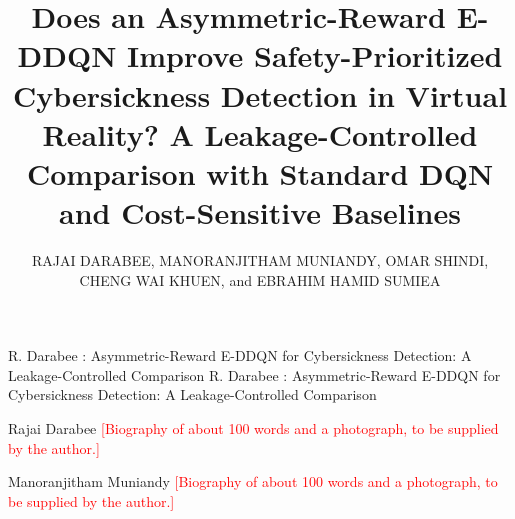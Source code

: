 \documentclass{ieeeaccess}
\newcounter{biography}  %
\newcommand{\authorinput}[1]{\textcolor{red}{[#1]}}
\begin{document}
\newlength{\xfigwd}\setlength{\xfigwd}{\columnwidth}  %

\title{Does an Asymmetric-Reward E-DDQN Improve Safety-Prioritized Cybersickness Detection in Virtual Reality? A Leakage-Controlled Comparison with Standard DQN and Cost-Sensitive Baselines}

\author{\uppercase{Rajai Darabee},
\uppercase{Manoranjitham Muniandy},
\uppercase{Omar Shindi},
\uppercase{Cheng Wai Khuen}, and
\uppercase{Ebrahim Hamid Sumiea}}

\address[1]{Faculty of Science, Management \& Computing, Universiti Teknologi PETRONAS, 32610 Seri Iskandar, Perak, Malaysia}
\address[2]{School of Information Technology, Crown Institute of Higher Education, Sydney, Australia}

\markboth
{R. Darabee \headeretal: Asymmetric-Reward E-DDQN for Cybersickness Detection: A Leakage-Controlled Comparison}
{R. Darabee \headeretal: Asymmetric-Reward E-DDQN for Cybersickness Detection: A Leakage-Controlled Comparison}




\titlepgskip=-15pt

\maketitle














\begin{IEEEbiography}{Rajai Darabee}
\authorinput{Biography of about 100 words and a photograph, to be supplied by the author.}
\end{IEEEbiography}

\begin{IEEEbiography}{Manoranjitham Muniandy}
\authorinput{Biography of about 100 words and a photograph, to be supplied by the author.}
\end{IEEEbiography}
\end{document}

